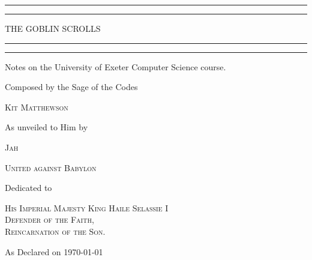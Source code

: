 \documentclass[twoside]{report}
\theoremstyle{definition}
\begin{document}


\begin{titlepage}

    \centering
    \vspace*{\baselineskip}

    \rule{\textwidth}{1.6pt}\vspace*{-\baselineskip}\vspace*{2pt}
    \rule{\textwidth}{0.4pt}

    \vspace{0.75\baselineskip}

    {\scshape\LARGE THE GOBLIN SCROLLS}

    \rule{\textwidth}{0.4pt}\vspace*{-\baselineskip}\vspace{3.2pt}
    \rule{\textwidth}{1.6pt}

    \vspace{2\baselineskip}

    Notes on the University of Exeter Computer Science course.

    \vspace*{5\baselineskip}

    Composed by the Sage of the Codes

    \vspace{0.5\baselineskip}

    {\scshape\Large Kit Matthewson}

    \vspace{1\baselineskip}

    As unveiled to Him by

    \vspace{0.5\baselineskip}

    {\scshape\Large Jah}

    \vspace{5\baselineskip}

    {\scshape\normalsize United against Babylon}

    \vspace{5\baselineskip}

    Dedicated to

        {\scshape\normalsize His Imperial Majesty King Haile Selassie I\\Defender of the Faith,\\Reincarnation of the Son.}

    \vspace{12\baselineskip}

    As Declared on \today

\end{titlepage}
\end{document}
